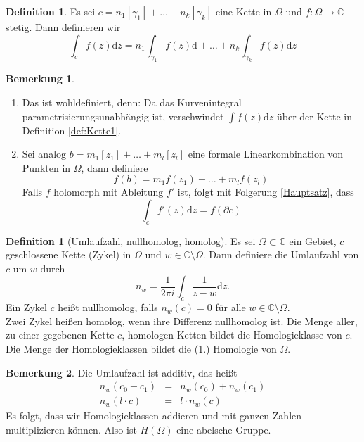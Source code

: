 \documentclass[11pt,titlepage]{article}
\theoremstyle{definition}
\newtheorem{definition}[theorem]{Definition}
\newtheorem{remark}{Bemerkung}
\theoremstyle{remark}
\begin{document}
	\begin{definition}
		Es sei $c=n_1[\gamma_1]+\ldots+n_k[\gamma_k]$ eine Kette in $\Omega$ und 
		$f:\Omega\to\mathbb{C}$ stetig. Dann definieren wir
		\[ \int_c f(z)\mathrm{d}z =n_1 \int_{\gamma_1}f(z)\mathrm{d}+\ldots+
		n_k \int_{\gamma_k}f(z)\mathrm{d}z \]
	\end{definition}
	
	\begin{remark}
		\begin{enumerate}
			\item Das ist wohldefiniert, denn: Da das Kurvenintegral parametrisierungsunabhängig ist, 
			verschwindet $\int f(z)\mathrm{d}z$ über der Kette in Definition \ref{def:Kette1}.
			
			\item Sei analog $b=m_1[z_1]+\ldots+m_l[z_l]$ eine formale Linearkombination von 
			Punkten in $\Omega$, dann definiere
			\[ f(b)=m_1f(z_1)+\ldots+m_lf(z_l) \]
			Falls $f$ holomorph mit Ableitung $f'$ ist, folgt mit Folgerung \ref{Hauptsatz}, dass
			\[ \int_c f'(z)\mathrm{d}z=f(\partial c) \]
		\end{enumerate}
	\end{remark}
	
	\begin{definition}[Umlaufzahl, nullhomolog, homolog]
		Es sei $\Omega\subset\mathbb{C}$ ein Gebiet, $c$ geschlossene Kette (Zykel) in $\Omega$ 
		und $w\in\mathbb{C}\setminus\Omega$. Dann definiere die Umlaufzahl von $c$ um $w$ durch
		\[ n_w = \frac{1}{2\pi i} \int_c \frac{1}{z-w}\mathrm{d}z. \]
		Ein Zykel $c$ heißt nullhomolog, falls $n_w(c)=0$ für alle $w\in\mathbb{C}\setminus\Omega$. \\
		Zwei Zykel heißen homolog, wenn ihre Differenz nullhomolog ist. Die Menge aller, zu einer 
		gegebenen Kette $c$, homologen Ketten bildet die Homologieklasse von $c$. 
		Die Menge der Homologieklassen bildet die (1.) Homologie von $\Omega$.
	\end{definition}
	
	\begin{remark}
		Die Umlaufzahl ist additiv, das heißt
		\begin{eqnarray*}
			n_w(c_0+c_1)&=&n_w(c_0)+n_w(c_1) \\
			n_w(l\cdot c)&=&l\cdot n_w(c)
		\end{eqnarray*}
		Es folgt, dass wir Homologieklassen addieren und mit ganzen Zahlen multiplizieren können. 
		Also ist $H(\Omega)$ eine abelsche Gruppe.
	\end{remark}
	
\end{document}
